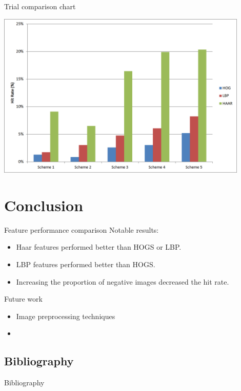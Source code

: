 \documentclass{beamer}
\begin{document}
\begin{frame}{Trial comparison chart}
	\begin{center}
		\includegraphics[width=0.9\textwidth]{results_graph}
	\end{center}
\end{frame}

\section{Conclusion}

\begin{frame}{Feature performance comparison}
	Notable results:
	\begin{itemize}
		\item Haar features performed better than HOGS or LBP.
		\item LBP features performed better than HOGS.
		\item Increasing the proportion of negative images decreased the hit rate.
	\end{itemize}
\end{frame}

\begin{frame}{Future work}
	\begin{itemize}
		\item Image preprocessing techniques
		\item 
	\end{itemize}
\end{frame}

\subsection{Bibliography}

\begin{frame}{Bibliography}
	\footnotesize
	
	
\end{frame}
\end{document}

